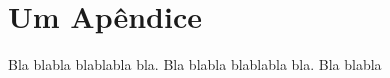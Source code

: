 \documentclass[eq,capa]{texufpel}
\begin{document}



 

\apendices
\chapter{Um Apêndice}

Bla blabla blablabla bla.  Bla blabla blablabla bla.  Bla blabla



\end{document}
